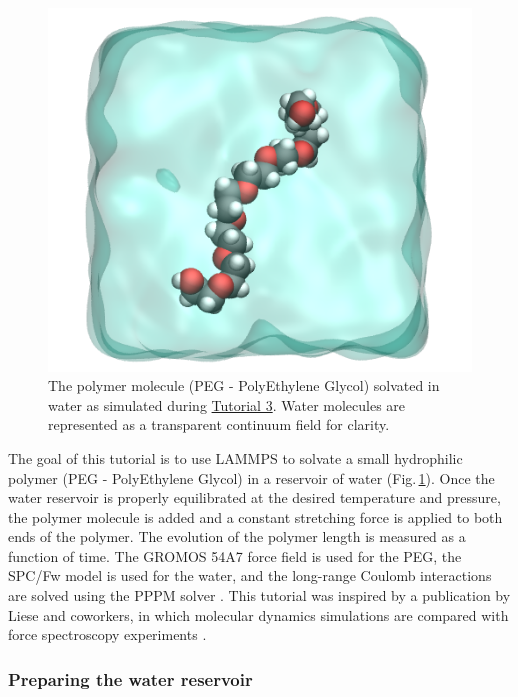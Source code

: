 \documentclass[9pt,tutorial]{livecoms}
\begin{document}
\begin{figure}
\centering
\includegraphics[width=0.55\linewidth]{PEG}
\caption{The polymer molecule (PEG - PolyEthylene Glycol) solvated in water as
simulated during \hyperref[all-atoms-label]{Tutorial 3}. Water molecules are
represented as a transparent continuum field for clarity.}
\label{fig:PEG}
\end{figure}

\noindent The goal of this tutorial is to use LAMMPS to solvate a small hydrophilic
polymer (PEG - PolyEthylene Glycol) in a reservoir of water (Fig.\,\ref{fig:PEG}).
Once the water reservoir is properly equilibrated at the desired temperature and
pressure, the polymer molecule is added and a constant stretching force is applied
to both ends of the polymer. The evolution of the polymer length is measured as
a function of time. The GROMOS 54A7 force field \cite{schmid2011definition} is used
for the PEG, the SPC/Fw model \cite{wu2006flexible} is used for the water, and the
long-range Coulomb interactions are solved using the PPPM solver \cite{luty1996calculating}.
This tutorial was inspired by a publication by Liese and coworkers, in which molecular
dynamics simulations are compared with force spectroscopy experiments \cite{liese2017hydration}.

\subsubsection{Preparing the water reservoir}
\end{document}
